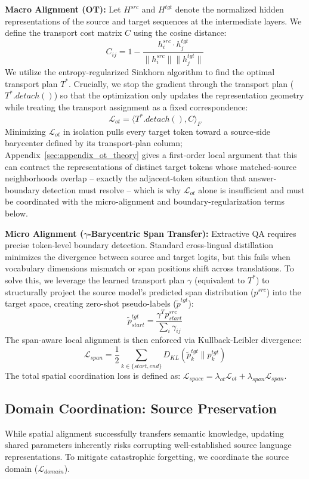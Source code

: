 \documentclass[11pt]{article}
\begin{document}
\textbf{Macro Alignment (OT):} Let $H^{src}$ and $H^{tgt}$ denote the normalized hidden representations of the source and target sequences at the intermediate layers. We define the transport cost matrix $C$ using the cosine distance:
$$ C_{ij} = 1 - \frac{h^{src}_i \cdot h^{tgt}_j}{\|h^{src}_i\| \|h^{tgt}_j\|} $$
We utilize the entropy-regularized Sinkhorn algorithm to find the optimal transport plan $T^*$. Crucially, we stop the gradient through the transport plan ($T^*.detach()$) so that the optimization only updates the representation geometry while treating the transport assignment as a fixed correspondence:
$$ \mathcal{L}_{ot} = \langle T^*.detach(), C \rangle_F $$
Minimizing $\mathcal{L}_{ot}$ in isolation pulls every target token toward a source-side barycenter defined by its transport-plan column; Appendix~\ref{sec:appendix_ot_theory} gives a first-order local argument that this can contract the representations of distinct target tokens whose matched-source neighborhoods overlap -- exactly the adjacent-token situation that answer-boundary detection must resolve -- which is why $\mathcal{L}_{ot}$ alone is insufficient and must be coordinated with the micro-alignment and boundary-regularization terms below.

\textbf{Micro Alignment ($\gamma$-Barycentric Span Transfer):} Extractive QA requires precise token-level boundary detection. Standard cross-lingual distillation minimizes the divergence between source and target logits, but this fails when vocabulary dimensions mismatch or span positions shift across translations. To solve this, we leverage the learned transport plan $\gamma$ (equivalent to $T^*$) to structurally project the source model's predicted span distribution ($p^{src}$) into the target space, creating zero-shot pseudo-labels ($\tilde{p}^{tgt}$):
$$ \tilde{p}^{tgt}_{start} = \frac{\gamma^T p^{src}_{start}}{\sum_i \gamma_{ij}} $$
The span-aware local alignment is then enforced via Kullback-Leibler divergence:
$$ \mathcal{L}_{span} = \frac{1}{2} \sum_{k \in \{start, end\}} D_{KL}(\tilde{p}^{tgt}_{k} \| p^{tgt}_{k}) $$
The total spatial coordination loss is defined as: $\mathcal{L}_{space} = \lambda_{ot}\mathcal{L}_{ot} + \lambda_{span}\mathcal{L}_{span}$.

\subsection{Domain Coordination: Source Preservation}
\label{sec:domain}
While spatial alignment successfully transfers semantic knowledge, updating shared parameters inherently risks corrupting well-established source language representations. To mitigate catastrophic forgetting, we coordinate the source domain ($\mathcal{L}_{domain}$).
\end{document}
